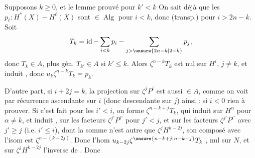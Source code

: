 
Supposons $k\geq0$, et le lemme prouvé pour $k'<k$ On sait déjà que les $p_\ell:H^*(X)\mathbin{-}H^\ell(X)$ sont $\in\operatorname{Alg}$ pour $i<k$, donc (transp.) pour $i>2n-k$. Soit
\[
T_k=\operatorname{id}-\sum_{i<k}p_i-\sum_{j>\unsure{2n-k|2-k}}p_j,
\]
donc $T_k\in A$, plus gén. $T_{k'}\in A$ si $k'\leq k$. Alors $\zeta^{n-k}T_k$ est nul sur $H^i$, $j\neq k$, et induit
, donc $u_k\zeta^{n-k}T_k=p_k$.

D'autre part, si $i+2j=k$,  la projection sur $\zeta^jP^i$ est aussi $\in A$, comme on voit  par récurrence ascendante sur $i$ (donc descendante sur $j$) ainsi : si $i<0$ rien à prouver. Si c'est fait pour les $i'<i$, on forme $\zeta^{n-k+j}T_k$,  qui induit  sur $H^\alpha$ pour $\alpha\neq k$, et induit
,   sur les facteurs $\zeta^{j'}P^{i'}$ pour $j'<j$,  et sur les facteurs $\zeta^{j'}P^{i'}$ avec $j'\geq j$ (i.e. $i'\leq i$),  dont la somme n'est autre que $\zeta^jH^{k-2j}$, son composé avec l'isom
est $\zeta^{n-(k-2j)}$. Donc l'hom $u_{k-2j}\zeta^{\unsure{n-k+j|n-k-j}}T_k$ , nul sur $N$, et sur $\zeta^jH^{k-2j}$ l'inverse de
. Donc

